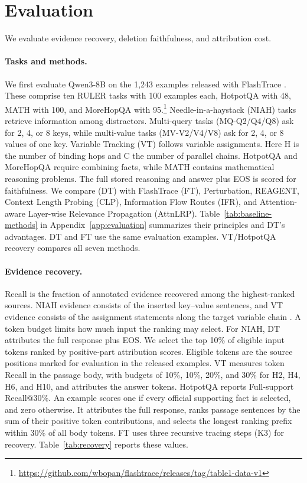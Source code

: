 \section{Evaluation}
\label{sec:evaluation}
We evaluate evidence recovery, deletion faithfulness, and attribution cost.

\paragraph{Tasks and methods.}
We first evaluate Qwen3-8B on the 1,243 examples released with FlashTrace \citep{pan2026flashtrace}. These comprise ten RULER tasks with 100 examples each, HotpotQA with 48, MATH with 100, and MoreHopQA with 95.\footnote{\url{https://github.com/wbopan/flashtrace/releases/tag/table1-data-v1}} Needle-in-a-haystack (NIAH) tasks retrieve information among distractors. Multi-query tasks (MQ-Q2/Q4/Q8) ask for 2, 4, or 8 keys, while multi-value tasks (MV-V2/V4/V8) ask for 2, 4, or 8 values of one key. Variable Tracking (VT) follows variable assignments. Here H is the number of binding hops and C the number of parallel chains. HotpotQA and MoreHopQA require combining facts, while MATH contains mathematical reasoning problems. The full stored reasoning and answer plus EOS is scored for faithfulness. We compare \dt{} (DT) with FlashTrace (FT), Perturbation, REAGENT, Context Length Probing (CLP), Information Flow Routes (IFR), and Attention-aware Layer-wise Relevance Propagation (AttnLRP). Table~\ref{tab:baseline-methods} in Appendix~\ref{app:evaluation} summarizes their principles and DT's advantages. DT and FT use the same evaluation examples. VT/HotpotQA recovery compares all seven methods.

\paragraph{Evidence recovery.}
Recall is the fraction of annotated evidence recovered among the highest-ranked sources. NIAH evidence consists of the inserted key--value sentences, and VT evidence consists of the assignment statements along the target variable chain \citep{pan2026flashtrace}. A token budget limits how much input the ranking may select. For NIAH, DT attributes the full response plus EOS. We select the top 10\% of eligible input tokens ranked by positive-part attribution scores. Eligible tokens are the source positions marked for evaluation in the released examples. VT measures token Recall in the passage body, with budgets of 10\%, 10\%, 20\%, and 30\% for H2, H4, H6, and H10, and attributes the answer tokens. HotpotQA reports Full-support Recall@30\%. An example scores one if every official supporting fact is selected, and zero otherwise. It attributes the full response, ranks passage sentences by the sum of their positive token contributions, and selects the longest ranking prefix within 30\% of all body tokens. FT uses three recursive tracing steps (K3) for recovery. Table~\ref{tab:recovery} reports these values.

